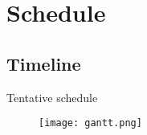 

\section{Schedule}

\subsection{Timeline}

\begin{frame}{Tentative schedule}
  \begin{figure}[h]
        \centering
        \texttt{[image: gantt.png]}
      \end{figure}
\end{frame}